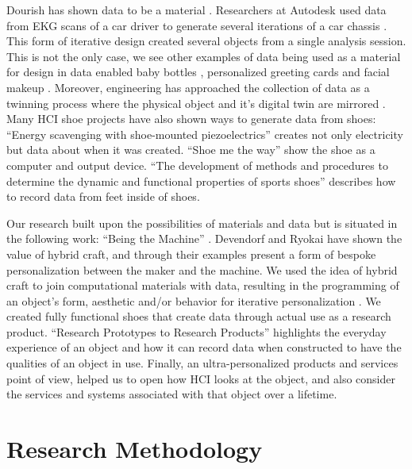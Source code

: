Dourish has shown data to be a material \cite{Dourish2017}. Researchers at Autodesk used data from EKG scans of a car driver to generate several iterations of a car chassis \cite{Nourbakhsh2016}. This form of iterative design created several objects from a single analysis session. This is not the only case, we see other examples of data being used as a material for design in data enabled baby bottles \cite{Bogers2016}, personalized greeting cards \cite{Benford2017} and facial makeup \cite{kao2016duoskin}. Moreover, engineering has approached the collection of data as a twinning process where the physical object and it's digital twin are mirrored \cite{Tao2018}. Many HCI shoe projects have also shown ways to generate data from shoes: ``Energy scavenging with shoe-mounted piezoelectrics'' \cite{Shenck2001} creates not only electricity but data about when it was created. ``Shoe me the way'' \cite{Schirmer2015} show the shoe as a computer and output device. ``The development of methods and procedures to determine the dynamic and functional properties of sports shoes'' \cite{Vertommen2011} describes how to record data from feet inside of shoes.  


Our research built upon the possibilities of materials and data but is situated in the following work: ``Being the Machine'' \cite{Devendorf2015}. Devendorf and Ryokai have shown the value of hybrid craft, and through their examples present a form of bespoke personalization between the maker and the machine. We used the idea of hybrid craft to join computational materials with data, resulting in the programming of an object's form, aesthetic and/or behavior for iterative personalization \cite{nachtigall2018towards}. We created fully functional shoes that create data through actual use as a research product. ``Research Prototypes to Research Products'' \cite{Odom2016} highlights the everyday experience of an object and how it can record data when constructed to have the qualities of an object in use. Finally, an ultra-personalized products and services \cite{Bhomer2016} point of view, helped us to open how HCI looks at the object, and also consider the services and systems associated with that object over a lifetime. 

\section{Research Methodology}



